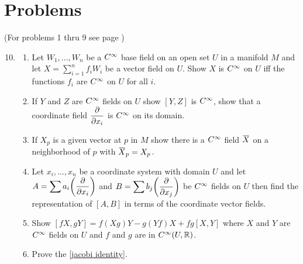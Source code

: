 \documentclass[../main]{subfiles}
\begin{document}
\section*{Problems}

(For problems 1 thru 9 see page \pageref{ch01:ex1})

\begin{enumerate}
\setcounter{enumi}{9}

\item\label{pro:10}
\begin{enumerate}[label=(\roman{enumii})]
    \item Let $W_1,\dots, W_n$ be a $C^\infty$ base field on an open set $U$ in a manifold $M$ and let $X = \sum\limits_{i=1}^{n} f_i W_i$ be a vector field on $U$. Show $X$ is $C^\infty$ on $U$ iff the functions $f_i$ are $C^\infty$ on $U$ for all $i$.
    \item If $Y$ and $Z$ are $C^\infty$ fields on $U$ show $[Y,Z]$ is $C^\infty$, show that a coordinate field $\dfrac{\partial }{\partial x_i}$ is $C^\infty$ on its domain.
    \item If $X_p$ is a given vector at $p$ in $M$ show there is a $C^\infty$ field $\xoverline{X}$ on a neighborhood of $p$ with $\xoverline{X}_p = X_p$.
    \item Let $x_i, \dots, x_n$ be a coordinate system with domain $U$ and let \newline $A = \displaystyle \sum a_i \bigg(\dfrac{\partial }{\partial x_i}\bigg)$ and $B=\displaystyle \sum b_j \bigg(\dfrac{\partial }{\partial x_j}\bigg)$ be $C^\infty$ fields on $U$ then find the representation of $[A,B]$ in terms of the coordinate vector fields.
    \item Show $[fX,gY] = f(Xg)Y - g(Yf)X + fg[X,Y]$ where $X$ and $Y$ are $C^\infty$ fields on $U$ and $f$ and $g$ are in $C^\infty(U,\mathbb{R})$. 
    \item Prove the \ref{jacobi identity}.
\end{enumerate}



\end{enumerate}
\end{document}
